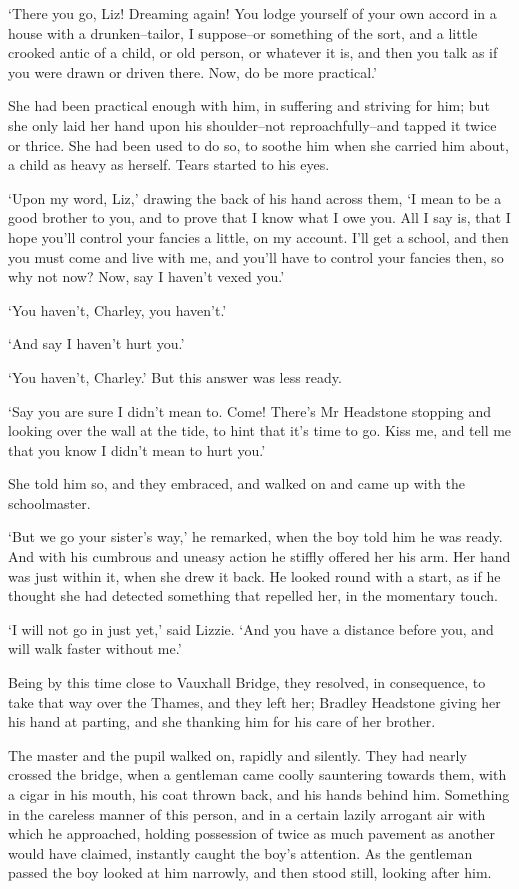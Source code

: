 ‘There you go, Liz! Dreaming again! You lodge yourself of your own
accord in a house with a drunken--tailor, I suppose--or something of the
sort, and a little crooked antic of a child, or old person, or whatever
it is, and then you talk as if you were drawn or driven there. Now, do
be more practical.’

She had been practical enough with him, in suffering and striving
for him; but she only laid her hand upon his shoulder--not
reproachfully--and tapped it twice or thrice. She had been used to
do so, to soothe him when she carried him about, a child as heavy as
herself. Tears started to his eyes.

‘Upon my word, Liz,’ drawing the back of his hand across them, ‘I mean
to be a good brother to you, and to prove that I know what I owe you.
All I say is, that I hope you’ll control your fancies a little, on my
account. I’ll get a school, and then you must come and live with me,
and you’ll have to control your fancies then, so why not now? Now, say I
haven’t vexed you.’

‘You haven’t, Charley, you haven’t.’

‘And say I haven’t hurt you.’

‘You haven’t, Charley.’ But this answer was less ready.

‘Say you are sure I didn’t mean to. Come! There’s Mr Headstone stopping
and looking over the wall at the tide, to hint that it’s time to go.
Kiss me, and tell me that you know I didn’t mean to hurt you.’

She told him so, and they embraced, and walked on and came up with the
schoolmaster.

‘But we go your sister’s way,’ he remarked, when the boy told him he was
ready. And with his cumbrous and uneasy action he stiffly offered her
his arm. Her hand was just within it, when she drew it back. He looked
round with a start, as if he thought she had detected something that
repelled her, in the momentary touch.

‘I will not go in just yet,’ said Lizzie. ‘And you have a distance
before you, and will walk faster without me.’

Being by this time close to Vauxhall Bridge, they resolved, in
consequence, to take that way over the Thames, and they left her;
Bradley Headstone giving her his hand at parting, and she thanking him
for his care of her brother.

The master and the pupil walked on, rapidly and silently. They had
nearly crossed the bridge, when a gentleman came coolly sauntering
towards them, with a cigar in his mouth, his coat thrown back, and his
hands behind him. Something in the careless manner of this person,
and in a certain lazily arrogant air with which he approached, holding
possession of twice as much pavement as another would have claimed,
instantly caught the boy’s attention. As the gentleman passed the boy
looked at him narrowly, and then stood still, looking after him.

